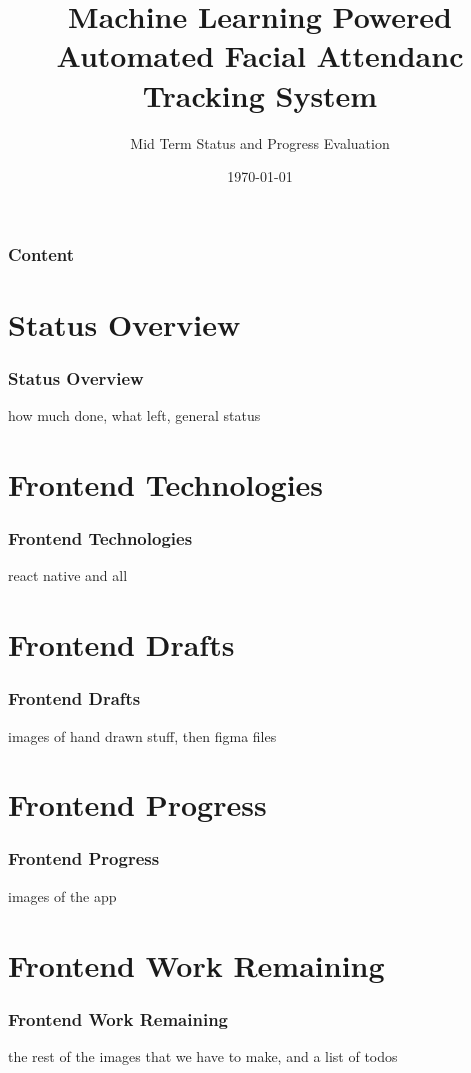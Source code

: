 \documentclass[aspectratio=169]{beamer}
\title{Machine Learning Powered Automated Facial Attendanc Tracking System}
\author{Mid Term Status and Progress Evaluation}
\date{\today}
\begin{document}
\begin{frame}
	\titlepage
\end{frame}

\begin{frame}
	\frametitle{Content}
	\tableofcontents
\end{frame}

\section{Status Overview}
\begin{frame}
	\centering
	\frametitle{Status Overview}
	\begin{minipage}{0.95\textwidth}
		how much done, what left, general status
	\end{minipage}
\end{frame}
\section{Frontend Technologies}
\begin{frame}
	\centering
	\frametitle{Frontend Technologies}
	\begin{minipage}{0.95\textwidth}
		react native and all
	\end{minipage}
\end{frame}
\section{Frontend Drafts}
\begin{frame}
	\centering
	\frametitle{Frontend Drafts}
	\begin{minipage}{0.95\textwidth}
		images of hand drawn stuff, then figma files
	\end{minipage}
\end{frame}
\section{Frontend Progress}
\begin{frame}
	\centering
	\frametitle{Frontend Progress}
	\begin{minipage}{0.95\textwidth}
		images of the app
	\end{minipage}
\end{frame}
\section{Frontend Work Remaining}
\begin{frame}
	\centering
	\frametitle{Frontend Work Remaining}
	\begin{minipage}{0.95\textwidth}
		the rest of the images that we have to make, and a list of todos
	\end{minipage}
\end{frame}
\end{document}
